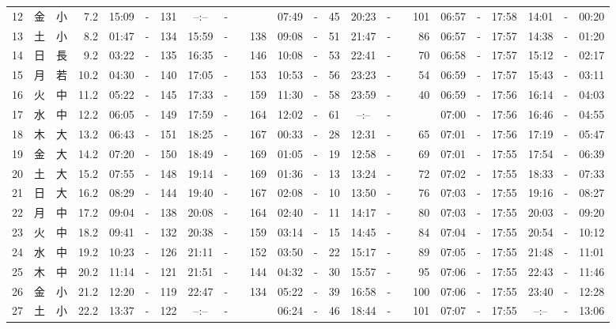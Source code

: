 \documentclass[12pt,a4j]{jsarticle}
\begin{document}
\begin{table}[htbp]
\begin{center}
{\begin{tabular}{|rc|cr|ccrccr|ccrccr|ccc|ccc|}
12 & 金 & 小 &  7.2 &  15:09 &-& 131 &  --:-- &-&~~~~~ &  07:49 &-&  45 &  20:23 &-& 101 & 06:57 & -& 17:58 & 14:01 & -& 00:20 \\
13 & 土 & 小 &  8.2 &  01:47 &-& 134 &  15:59 &-& 138 &  09:08 &-&  51 &  21:47 &-&  86 & 06:57 & -& 17:57 & 14:38 & -& 01:20 \\
14 & 日 & 長 &  9.2 &  03:22 &-& 135 &  16:35 &-& 146 &  10:08 &-&  53 &  22:41 &-&  70 & 06:58 & -& 17:57 & 15:12 & -& 02:17 \\
15 & 月 & 若 & 10.2 &  04:30 &-& 140 &  17:05 &-& 153 &  10:53 &-&  56 &  23:23 &-&  54 & 06:59 & -& 17:57 & 15:43 & -& 03:11 \\
16 & 火 & 中 & 11.2 &  05:22 &-& 145 &  17:33 &-& 159 &  11:30 &-&  58 &  23:59 &-&  40 & 06:59 & -& 17:56 & 16:14 & -& 04:03 \\
17 & 水 & 中 & 12.2 &  06:05 &-& 149 &  17:59 &-& 164 &  12:02 &-&  61 &  --:-- &-&~~~~~ & 07:00 & -& 17:56 & 16:46 & -& 04:55 \\
18 & 木 & 大 & 13.2 &  06:43 &-& 151 &  18:25 &-& 167 &  00:33 &-&  28 &  12:31 &-&  65 & 07:01 & -& 17:56 & 17:19 & -& 05:47 \\
19 & 金 & 大 & 14.2 &  07:20 &-& 150 &  18:49 &-& 169 &  01:05 &-&  19 &  12:58 &-&  69 & 07:01 & -& 17:55 & 17:54 & -& 06:39 \\
20 & 土 & 大 & 15.2 &  07:55 &-& 148 &  19:14 &-& 169 &  01:36 &-&  13 &  13:24 &-&  72 & 07:02 & -& 17:55 & 18:33 & -& 07:33 \\
21 & 日 & 大 & 16.2 &  08:29 &-& 144 &  19:40 &-& 167 &  02:08 &-&  10 &  13:50 &-&  76 & 07:03 & -& 17:55 & 19:16 & -& 08:27 \\
22 & 月 & 中 & 17.2 &  09:04 &-& 138 &  20:08 &-& 164 &  02:40 &-&  11 &  14:17 &-&  80 & 07:03 & -& 17:55 & 20:03 & -& 09:20 \\
23 & 火 & 中 & 18.2 &  09:41 &-& 132 &  20:38 &-& 159 &  03:14 &-&  15 &  14:45 &-&  84 & 07:04 & -& 17:55 & 20:54 & -& 10:12 \\
24 & 水 & 中 & 19.2 &  10:23 &-& 126 &  21:11 &-& 152 &  03:50 &-&  22 &  15:17 &-&  89 & 07:05 & -& 17:55 & 21:48 & -& 11:01 \\
25 & 木 & 中 & 20.2 &  11:14 &-& 121 &  21:51 &-& 144 &  04:32 &-&  30 &  15:57 &-&  95 & 07:06 & -& 17:55 & 22:43 & -& 11:46 \\
26 & 金 & 小 & 21.2 &  12:20 &-& 119 &  22:47 &-& 134 &  05:22 &-&  39 &  16:58 &-& 100 & 07:06 & -& 17:55 & 23:40 & -& 12:28 \\
27 & 土 & 小 & 22.2 &  13:37 &-& 122 &  --:-- &-&~~~~~ &  06:24 &-&  46 &  18:44 &-& 101 & 07:07 & -& 17:55 & --:-- & -& 13:06 \\

\end{tabular}}
\end{center}
\end{table}
\end{document}
